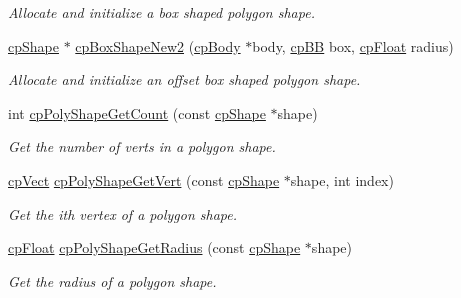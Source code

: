 \begin{DoxyCompactItemize}
\begin{DoxyCompactList}\small\item\em Allocate and initialize a box shaped polygon shape. \end{DoxyCompactList}\item 
\hypertarget{group__cp_poly_shape_ga0f67ca6d1f3123717d5d057149091cb9}{}\hyperlink{structcp_shape}{cp\+Shape} $\ast$ \hyperlink{group__cp_poly_shape_ga0f67ca6d1f3123717d5d057149091cb9}{cp\+Box\+Shape\+New2} (\hyperlink{structcp_body}{cp\+Body} $\ast$body, \hyperlink{structcp_b_b}{cp\+B\+B} box, \hyperlink{group__basic_types_gac1ed65573e035bf892505768c852d8d3}{cp\+Float} radius)\label{group__cp_poly_shape_ga0f67ca6d1f3123717d5d057149091cb9}

\begin{DoxyCompactList}\small\item\em Allocate and initialize an offset box shaped polygon shape. \end{DoxyCompactList}\item 
\hypertarget{group__cp_poly_shape_gae57b293c0f088bb1ee4f379def4ff830}{}int \hyperlink{group__cp_poly_shape_gae57b293c0f088bb1ee4f379def4ff830}{cp\+Poly\+Shape\+Get\+Count} (const \hyperlink{structcp_shape}{cp\+Shape} $\ast$shape)\label{group__cp_poly_shape_gae57b293c0f088bb1ee4f379def4ff830}

\begin{DoxyCompactList}\small\item\em Get the number of verts in a polygon shape. \end{DoxyCompactList}\item 
\hypertarget{group__cp_poly_shape_ga4301568bd2cef8973338d37fdfbeb12d}{}\hyperlink{structcp_vect}{cp\+Vect} \hyperlink{group__cp_poly_shape_ga4301568bd2cef8973338d37fdfbeb12d}{cp\+Poly\+Shape\+Get\+Vert} (const \hyperlink{structcp_shape}{cp\+Shape} $\ast$shape, int index)\label{group__cp_poly_shape_ga4301568bd2cef8973338d37fdfbeb12d}

\begin{DoxyCompactList}\small\item\em Get the {\ttfamily ith} vertex of a polygon shape. \end{DoxyCompactList}\item 
\hypertarget{group__cp_poly_shape_ga0628f3107d3f1c30fdf7d082312a3411}{}\hyperlink{group__basic_types_gac1ed65573e035bf892505768c852d8d3}{cp\+Float} \hyperlink{group__cp_poly_shape_ga0628f3107d3f1c30fdf7d082312a3411}{cp\+Poly\+Shape\+Get\+Radius} (const \hyperlink{structcp_shape}{cp\+Shape} $\ast$shape)\label{group__cp_poly_shape_ga0628f3107d3f1c30fdf7d082312a3411}

\begin{DoxyCompactList}\small\item\em Get the radius of a polygon shape. \end{DoxyCompactList}\end{DoxyCompactItemize}


